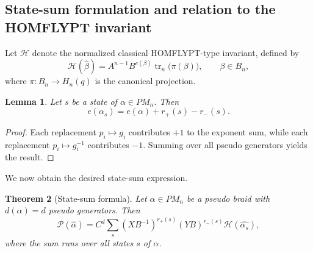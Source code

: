 \documentclass[11pt]{article}
\numberwithin{equation}{section}
\newtheorem{theorem}{Theorem}[section]
\newtheorem{lemma}[theorem]{Lemma}
\theoremstyle{definition}
\begin{document}


\subsection{State-sum formulation and relation to the HOMFLYPT invariant}

Let \(\mathcal H\) denote the normalized classical HOMFLYPT-type invariant, defined by
\[
\mathcal H(\widehat{\beta})
=
A^{n-1} B^{e(\beta)} \operatorname{tr}_n\big(\pi(\beta)\big),
\qquad \beta \in B_n,
\]
where \(\pi: B_n \to H_n(q)\) is the canonical projection.

\begin{lemma}\label{lem:resolution-expansion}
Let \(s\) be a state of \(\alpha \in PM_n\). Then
\[
e(\alpha_s) = e(\alpha) + r_+(s) - r_-(s).
\]
\end{lemma}

\begin{proof}
Each replacement \(p_i \mapsto g_i\) contributes \(+1\) to the exponent sum, while each replacement \(p_i \mapsto g_i^{-1}\) contributes \(-1\). Summing over all pseudo generators yields the result.
\end{proof}




We now obtain the desired state-sum expression.

\begin{theorem}[State-sum formula]
Let \(\alpha \in PM_n\) be a pseudo braid with \(d(\alpha)=d\) pseudo generators. Then
\[
\mathcal P(\widehat{\alpha})
=
C^d
\sum_s
\left(X B^{-1}\right)^{r_+(s)}
\left(Y B\right)^{r_-(s)}
\mathcal H(\widehat{\alpha_s}),
\]
where the sum runs over all states \(s\) of \(\alpha\).
\end{theorem}
\end{document}
